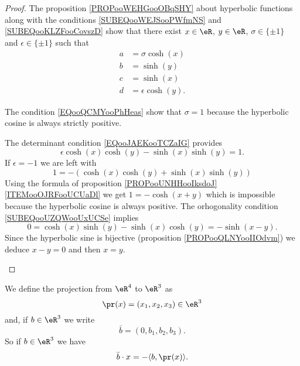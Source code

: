 \begin{proof}
	The proposition \ref{PROPooWEHGooOBqSHY} about hyperbolic functions along with the conditions \eqref{SUBEQooWEJSooPWfmNS} and \ref{SUBEQooKLZFooCovszD} show that there exist \( x\in \eR\), \( y\in \eR\), \( \sigma\in\{ \pm1 \}\) and \( \epsilon\in\{ \pm 1 \}\) such that
	\begin{subequations}
		\begin{align}
			a & =\sigma\cosh(x)    \\
			b & =\sinh(y)          \\
			c & =\sinh(x)          \\
			d & =\epsilon\cosh(y).
		\end{align}
	\end{subequations}

	\begin{subproof}
		\spitem[\( \sigma=1\)]
		The condition \eqref{EQooQCMYooPhHeas} show that \( \sigma=1\) because the hyperbolic cosine is always strictly positive.

		\spitem[\( \epsilon=1\)]
		The determinant condition \eqref{EQooJAEKooTCZaIG} provides
		\begin{equation}
			\epsilon\cosh(x)\cosh(y)-\sinh(x)\sinh(y)=1.
		\end{equation}
		If \( \epsilon=-1\) we are left with
		\begin{equation}
			1=-(\cosh(x)\cosh(y)+\sinh(x)\sinh(y))
		\end{equation}
		Using the formula of proposition \ref{PROPooUNHHooIksdoJ}\ref{ITEMooOJRFooUCUaDl} we get $1=-\cosh(x+y)$ which is impossible because the hyperbolic cosine is always positive.
		\spitem[\( x=y\)]
		The orhogonality condition \eqref{SUBEQooUZQWooUxUCSe} implies
		\begin{equation}
			0=\cosh(x)\sinh(y)-\sinh(x)\cosh(y)=-\sinh(x-y).
		\end{equation}
		Since the hyperbolic sine is bijective (proposition \ref{PROPooQLNYooIIOdvm}) we deduce \( x-y=0\) and then \( x=y\).
	\end{subproof}
\end{proof}

We define the projection from \( \eR^4\) to \( \eR^3\) as
\begin{equation}
	\pr(x)=(x_1,x_2,x_3)\in \eR^3
\end{equation}
and, if \( b\in \eR^3\) we write
\begin{equation}
	\bar b=(0,b_1,b_2,b_3).
\end{equation}
So if \( b\in \eR^3\) we have
\begin{equation}        \label{EQooOIBWooAvxfYz}
	\bar b\cdot x=-\langle b, \pr(x)\rangle .
\end{equation}

